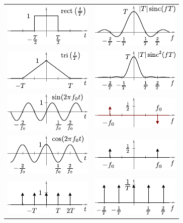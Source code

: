 \documentclass[fs, footer]{latex4ei}
\begin{document}
\begin{multicols*}{4}
{\begin{tabular*}{\columnwidth}{c@{\extracolsep\fill}c}
		\includegraphics{./img/FT/rect_t.pdf} &  \includegraphics{./img/FT/rect_f.pdf}\\[1em]
		\includegraphics{./img/FT/tri_t.pdf} & \includegraphics{./img/FT/tri_f.pdf}\\[1em]
		\includegraphics{./img/FT/sin_t.pdf} & \includegraphics{./img/FT/sin_f.pdf}\\[1em]
		\includegraphics{./img/FT/cos_t.pdf} & \includegraphics{./img/FT/cos_f.pdf}\\[1em]
		\includegraphics{./img/FT/dirac_folge_t.pdf} & \includegraphics{./img/FT/dirac_folge_f.pdf}\\[1em]
	\end{tabular*}


}
\end{multicols*}
\end{document}
